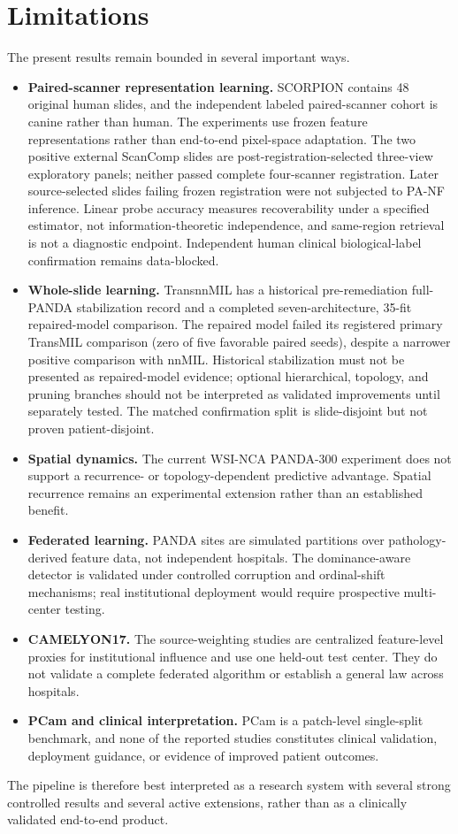 \section{Limitations}

The present results remain bounded in several important ways.

\begin{itemize}
\item \textbf{Paired-scanner representation learning.} SCORPION contains 48 original human slides, and the independent labeled paired-scanner cohort is canine rather than human. The experiments use frozen feature representations rather than end-to-end pixel-space adaptation. The two positive external ScanComp slides are post-registration-selected three-view exploratory panels; neither passed complete four-scanner registration. Later source-selected slides failing frozen registration were not subjected to PA-NF inference. Linear probe accuracy measures recoverability under a specified estimator, not information-theoretic independence, and same-region retrieval is not a diagnostic endpoint. Independent human clinical biological-label confirmation remains data-blocked.
\item \textbf{Whole-slide learning.} TransnnMIL has a historical pre-remediation full-PANDA stabilization record and a completed seven-architecture, 35-fit repaired-model comparison. The repaired model failed its registered primary TransMIL comparison (zero of five favorable paired seeds), despite a narrower positive comparison with nnMIL. Historical stabilization must not be presented as repaired-model evidence; optional hierarchical, topology, and pruning branches should not be interpreted as validated improvements until separately tested. The matched confirmation split is slide-disjoint but not proven patient-disjoint.
\item \textbf{Spatial dynamics.} The current WSI-NCA PANDA-300 experiment does not support a recurrence- or topology-dependent predictive advantage. Spatial recurrence remains an experimental extension rather than an established benefit.
\item \textbf{Federated learning.} PANDA sites are simulated partitions over pathology-derived feature data, not independent hospitals. The dominance-aware detector is validated under controlled corruption and ordinal-shift mechanisms; real institutional deployment would require prospective multi-center testing.
\item \textbf{CAMELYON17.} The source-weighting studies are centralized feature-level proxies for institutional influence and use one held-out test center. They do not validate a complete federated algorithm or establish a general law across hospitals.
\item \textbf{PCam and clinical interpretation.} PCam is a patch-level single-split benchmark, and none of the reported studies constitutes clinical validation, deployment guidance, or evidence of improved patient outcomes.
\end{itemize}

The pipeline is therefore best interpreted as a research system with several strong controlled results and several active extensions, rather than as a clinically validated end-to-end product.
